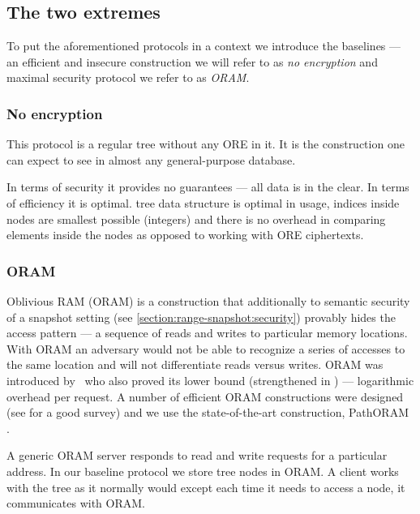 \subsection{The two extremes}

	To put the aforementioned protocols in a context we introduce the baselines --- an efficient and insecure construction we will refer to as \emph{no encryption} and maximal security protocol we refer to as \emph{ORAM}.

	\subsubsection{No encryption}

		This protocol is a regular {\BPlus} tree \cite{b-tree} without any ORE in it.
		It is the construction one can expect to see in almost any general-purpose database.

		In terms of security it provides no guarantees --- all data is in the clear.
		In terms of efficiency it is optimal.
		{\BPlus} tree data structure is optimal in {\IO} usage, indices inside nodes are smallest possible (integers) and there is no overhead in comparing elements inside the nodes as opposed to working with ORE ciphertexts.

	\subsubsection{ORAM}\label{section:range-snapshot:oram}

		Oblivious RAM (ORAM) is a construction that additionally to semantic security of a snapshot setting (see \cref{section:range-snapshot:security}) provably hides the access pattern --- a sequence of reads and writes to particular memory locations.
		With ORAM an adversary would not be able to recognize a series of accesses to the same location and will not differentiate reads versus writes.
		ORAM was introduced by~\textcite{oram-original} who also proved its lower bound (strengthened in \cite{oram-tighter-lower-bound}) --- logarithmic overhead per request.
		A number of efficient ORAM constructions were designed (see \cite{oram-survey-feifei} for a good survey) and we use the state-of-the-art construction, PathORAM \cite{path-oram}.

		A generic ORAM server responds to read and write requests for a particular address.
		In our baseline protocol we store {\BPlus} tree nodes in ORAM\@.
		A client works with the tree as it normally would except each time it needs to access a node, it communicates with ORAM\@.

